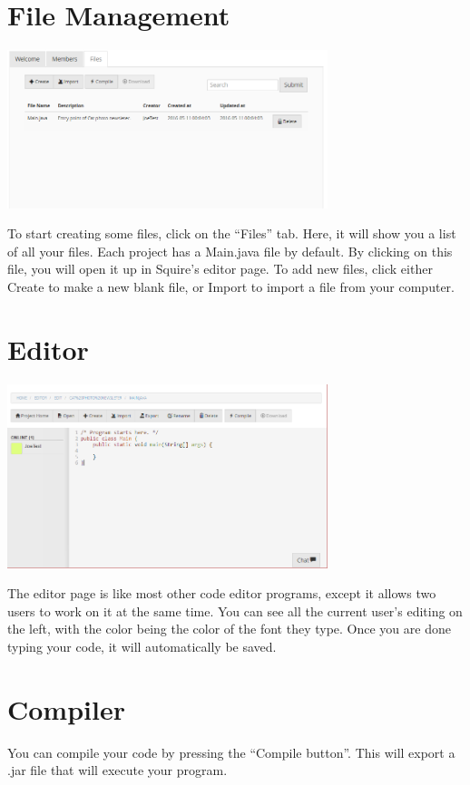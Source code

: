 \documentclass[11pt]{report}
\begin{document}
\section{File Management}
	\begin{center}
           \includegraphics[width=0.7\textwidth]{files.png}
    \end{center}
To start creating some files, click on the “Files” tab. Here, it will show you a list of all your files. Each project has a Main.java file by default. By clicking on this file, you will open it up in Squire’s editor page. To add new files, click either Create to make a new blank file, or Import to import a file from your computer. 

\section{Editor}
	\begin{center}
           \includegraphics[width=0.7\textwidth]{editor.png}
    \end{center}
The editor page is like most other code editor programs, except it allows two users to work on it at the same time. You can see all the current user's editing on the left, with the color being the color of the font they type. Once you are done typing your code, it will automatically be saved. 

\section{Compiler}
You can compile your code by pressing the “Compile button”. This will export a .jar file that will execute your program. 
\end{document}

